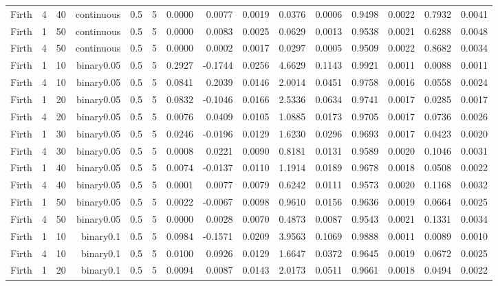 \begin{longtable}{rrrrrrrrrrrrrrr}
  Firth & 4 & 40 & continuous & 0.5 & 5 & 0.0000 & 0.0077 & 0.0019 & 0.0376 & 0.0006 & 0.9498 & 0.0022 & 0.7932 & 0.0041 \\ 
  Firth & 1 & 50 & continuous & 0.5 & 5 & 0.0000 & 0.0083 & 0.0025 & 0.0629 & 0.0013 & 0.9538 & 0.0021 & 0.6288 & 0.0048 \\ 
  Firth & 4 & 50 & continuous & 0.5 & 5 & 0.0000 & 0.0002 & 0.0017 & 0.0297 & 0.0005 & 0.9509 & 0.0022 & 0.8682 & 0.0034 \\ 
  Firth & 1 & 10 & binary0.05 & 0.5 & 5 & 0.2927 & -0.1744 & 0.0256 & 4.6629 & 0.1143 & 0.9921 & 0.0011 & 0.0088 & 0.0011 \\ 
  Firth & 4 & 10 & binary0.05 & 0.5 & 5 & 0.0841 & 0.2039 & 0.0146 & 2.0014 & 0.0451 & 0.9758 & 0.0016 & 0.0558 & 0.0024 \\ 
  Firth & 1 & 20 & binary0.05 & 0.5 & 5 & 0.0832 & -0.1046 & 0.0166 & 2.5336 & 0.0634 & 0.9741 & 0.0017 & 0.0285 & 0.0017 \\ 
  Firth & 4 & 20 & binary0.05 & 0.5 & 5 & 0.0076 & 0.0409 & 0.0105 & 1.0885 & 0.0173 & 0.9705 & 0.0017 & 0.0736 & 0.0026 \\ 
  Firth & 1 & 30 & binary0.05 & 0.5 & 5 & 0.0246 & -0.0196 & 0.0129 & 1.6230 & 0.0296 & 0.9693 & 0.0017 & 0.0423 & 0.0020 \\ 
  Firth & 4 & 30 & binary0.05 & 0.5 & 5 & 0.0008 & 0.0221 & 0.0090 & 0.8181 & 0.0131 & 0.9589 & 0.0020 & 0.1046 & 0.0031 \\ 
  Firth & 1 & 40 & binary0.05 & 0.5 & 5 & 0.0074 & -0.0137 & 0.0110 & 1.1914 & 0.0189 & 0.9678 & 0.0018 & 0.0508 & 0.0022 \\ 
  Firth & 4 & 40 & binary0.05 & 0.5 & 5 & 0.0001 & 0.0077 & 0.0079 & 0.6242 & 0.0111 & 0.9573 & 0.0020 & 0.1168 & 0.0032 \\ 
  Firth & 1 & 50 & binary0.05 & 0.5 & 5 & 0.0022 & -0.0067 & 0.0098 & 0.9610 & 0.0156 & 0.9636 & 0.0019 & 0.0664 & 0.0025 \\ 
  Firth & 4 & 50 & binary0.05 & 0.5 & 5 & 0.0000 & 0.0028 & 0.0070 & 0.4873 & 0.0087 & 0.9543 & 0.0021 & 0.1331 & 0.0034 \\ 
  Firth & 1 & 10 & binary0.1 & 0.5 & 5 & 0.0984 & -0.1571 & 0.0209 & 3.9563 & 0.1069 & 0.9888 & 0.0011 & 0.0089 & 0.0010 \\ 
  Firth & 4 & 10 & binary0.1 & 0.5 & 5 & 0.0100 & 0.0926 & 0.0129 & 1.6647 & 0.0372 & 0.9645 & 0.0019 & 0.0672 & 0.0025 \\ 
  Firth & 1 & 20 & binary0.1 & 0.5 & 5 & 0.0094 & 0.0087 & 0.0143 & 2.0173 & 0.0511 & 0.9661 & 0.0018 & 0.0494 & 0.0022 \\ 

\end{longtable}
